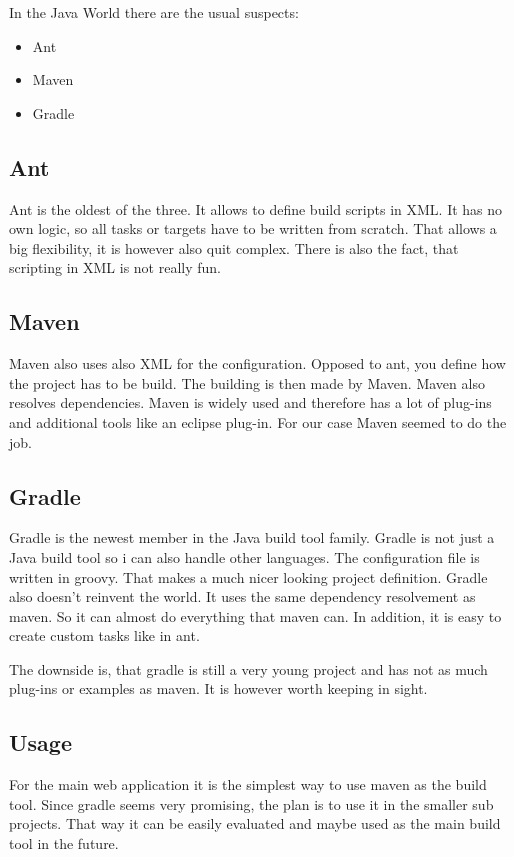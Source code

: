 \documentclass[paper=a4,twoside=false,BCOR=0mm,DIV=calc,fontsize=12pt]{scrartcl}
\begin{document}
In the Java World there are the usual suspects:
\begin{itemize}
 \item Ant
 \item Maven
 \item Gradle
\end{itemize}

\subsection{Ant}
Ant is the oldest of the three. It allows to define build scripts in XML. 
It has no own logic, so all tasks or targets have to be written from scratch.
That allows a big flexibility, it is however also quit complex. There is also the fact,
that scripting in XML is not really fun.


\subsection{Maven}
Maven also uses also XML for the configuration. Opposed to ant, you define how the project has to be build. The building is then
made by Maven. Maven also resolves dependencies. Maven is widely used and therefore has a lot of plug-ins and additional tools like an eclipse plug-in. For our case Maven seemed to do the job.


\subsection{Gradle}
Gradle is the newest member in the Java build tool family. Gradle is not just a Java build tool so i can also handle other languages. The configuration file is written in groovy. That makes a much nicer looking project definition.
Gradle also doesn't reinvent the world. It uses the same dependency resolvement as maven. So it can almost do everything that maven can. In addition, it is easy to create custom tasks like in ant.

The downside is, that gradle is still a very young project and has not as much plug-ins or examples as maven. It is however worth keeping in sight.

\subsection{Usage}
For the main web application it is the simplest way to use maven as the build tool. Since gradle seems very promising, the plan is to use it in the
smaller sub projects. That way it can be easily evaluated and maybe used as the main build tool in the future.
\end{document}

